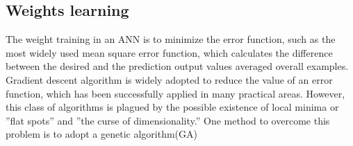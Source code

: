 

\subsection{Weights learning}
The weight training in an ANN is to minimize the error function, such as the
most widely used mean square error function, which calculates the difference
between the desired and the prediction output values averaged overall examples.
Gradient descent algorithm is widely adopted to reduce the value of an error
function, which has been successfully applied in many practical areas. However,
this class of algorithms is plagued by the possible existence of local minima
or ”flat spots” and ”the curse of dimensionality.” One method to overcome this
problem is to adopt a genetic algorithm(GA)

